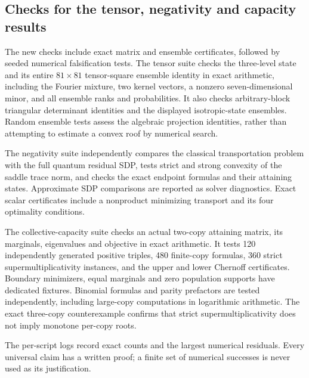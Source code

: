 \subsection{Checks for the tensor, negativity and capacity results}
The new checks include exact matrix and ensemble certificates, followed
by seeded numerical falsification tests. The tensor suite checks the
three-level state and its entire $81\times81$ tensor-square ensemble
identity in exact arithmetic, including the Fourier mixture, two kernel
vectors, a nonzero seven-dimensional minor, and all ensemble ranks and
probabilities. It also checks arbitrary-block triangular determinant
identities and the displayed isotropic-state ensembles. Random ensemble
tests assess the algebraic projection identities, rather than attempting
to estimate a convex roof by numerical search.

The negativity suite independently compares the classical transportation
problem with the full quantum residual SDP, tests strict and strong
convexity of the saddle trace norm, and checks the exact endpoint formulas
and their attaining states. Approximate SDP comparisons are reported as
solver diagnostics. Exact scalar certificates include a nonproduct
minimizing transport and its four optimality conditions.

The collective-capacity suite checks an actual two-copy attaining matrix,
its marginals, eigenvalues and objective in exact arithmetic. It tests
120 independently generated positive triples, 480 finite-copy formulas,
360 strict supermultiplicativity instances, and the upper and lower
Chernoff certificates. Boundary minimizers, equal marginals and zero
population supports have dedicated fixtures. Binomial formulas and parity
prefactors are tested independently, including large-copy computations in
logarithmic arithmetic. The exact three-copy counterexample confirms that
strict supermultiplicativity does not imply monotone per-copy roots.

The per-script logs record exact counts and the largest numerical residuals. Every universal
claim has a written proof; a finite set of numerical successes is never
used as its justification.
